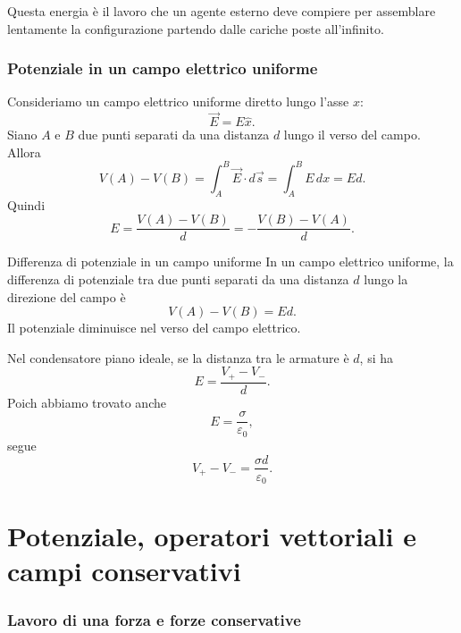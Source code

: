 \documentclass[a4paper]{article}
\begin{document}
Questa energia è il lavoro che un agente esterno deve compiere per assemblare lentamente la configurazione partendo dalle cariche poste all'infinito.

\section{Potenziale in un campo elettrico uniforme}

Consideriamo un campo elettrico uniforme diretto lungo l'asse \(x\):
\[
    \vec{E}=E\hat{x}.
\]
Siano \(A\) e \(B\) due punti separati da una distanza \(d\) lungo il verso del campo. Allora
\[
    V(A)-V(B)=\int_A^B \vec{E}\cdot d\vec{s}=\int_A^B E\,dx=Ed.
\]
Quindi
\[
    E=\frac{V(A)-V(B)}{d}=-\frac{V(B)-V(A)}{d}.
\]

\begin{snippetproposition}{Differenza di potenziale in un campo uniforme}
    In un campo elettrico uniforme, la differenza di potenziale tra due punti separati da una distanza \(d\) lungo la direzione del campo è
    \[
        V(A)-V(B)=Ed.
    \]
    Il potenziale diminuisce nel verso del campo elettrico.
\end{snippetproposition}

\begin{center}
\end{center}

Nel condensatore piano ideale, se la distanza tra le armature è \(d\), si ha
\[
    E=\frac{V_+-V_-}{d}.
\]
Poich abbiamo trovato anche
\[
    E=\frac{\sigma}{\varepsilon_0},
\]
segue
\[
    V_+-V_-=\frac{\sigma d}{\varepsilon_0}.
\]

\part{Potenziale, operatori vettoriali e campi conservativi}

\section{Lavoro di una forza e forze conservative}
\end{document}
